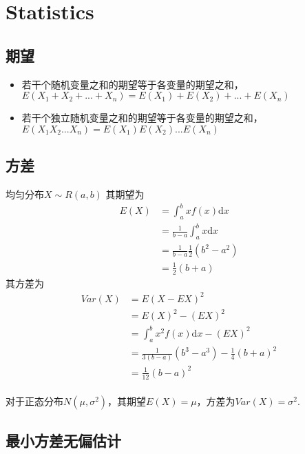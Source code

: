 \chapter{Statistics}

\section{期望}
\begin{itemize}
    \item 若干个随机变量之和的期望等于各变量的期望之和，$E(X_1 + X_2 + ... + X_n) = E(X_1) + E(X_2) + ... + E(X_n)$
    \item 若干个独立随机变量之和的期望等于各变量的期望之和，$E(X_1 X_2 ... X_n) = E(X_1)E(X_2)...E(X_n)$
\end{itemize}
\section{方差}
均匀分布$X \sim R(a, b)$
其期望为
\begin{equation}
    \begin{split}
        E(X) &= \int_{a}^{b}x f(x) \mathrm{d}x		\\
        &= \frac{1}{b-a}\int_{a}^{b}x\mathrm{d}x	\\
        &= \frac{1}{b-a} \frac{1}{2} (b^2 - a^2)	\\
        &= \frac{1}{2}(b + a)
    \end{split}
\end{equation}
其方差为
\begin{equation}
    \begin{split}
        Var(X) &= E(X - EX)^2  \\
        &= E(X)^2 - (EX)^2 \\
        &= \int_{a}^{b} x^2 f(x) \mathrm{d}x - (EX)^2 \\
        &= \frac{1}{3(b-a)} (b^3 - a^3) - \frac{1}{4}(b+a)^2 \\
        &= \frac{1}{12}(b-a)^2
    \end{split}
\end{equation}
\\
对于正态分布$N(\mu, \sigma ^2)$，其期望$E(X) = \mu$，方差为$Var(X) = \sigma^2$.


\section{最小方差无偏估计}
